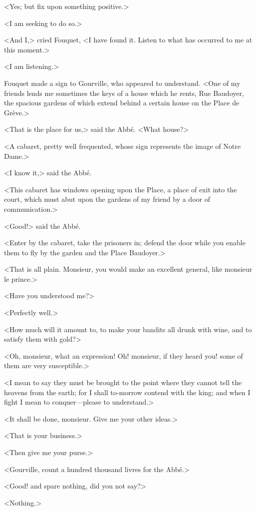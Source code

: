 <Yes; but fix upon something positive.>

<I am seeking to do so.>

<And I,> cried Fouquet, <I have found it. Listen to what has occurred to me at this moment.>

<I am listening.>

Fouquet made a sign to Gourville, who appeared to understand. <One of my friends lends me sometimes the keys of a house which he rents, Rue Baudoyer, the spacious gardens of which extend behind a certain house on the Place de Grève.>

<That is the place for us,> said the Abbé. <What house?>

<A cabaret, pretty well frequented, whose sign represents the image of Notre Dame.>

<I know it,> said the Abbé.

<This cabaret has windows opening upon the Place, a place of exit into the court, which must abut upon the gardens of my friend by a door of communication.>

<Good!> said the Abbé.

<Enter by the cabaret, take the prisoners in; defend the door while you enable them to fly by the garden and the Place Baudoyer.>

<That is all plain. Monsieur, you would make an excellent general, like monsieur le prince.>

<Have you understood me?>

<Perfectly well.>

<How much will it amount to, to make your bandits all drunk with wine, and to satisfy them with gold?>

<Oh, monsieur, what an expression! Oh! monsieur, if they heard you! some of them are very susceptible.>

<I mean to say they must be brought to the point where they cannot tell the heavens from the earth; for I shall to-morrow contend with the king; and when I fight I mean to conquer—please to understand.>

<It shall be done, monsieur. Give me your other ideas.>

<That is your business.>

<Then give me your purse.>

<Gourville, count a hundred thousand livres for the Abbé.>

<Good! and spare nothing, did you not say?>

<Nothing.>

